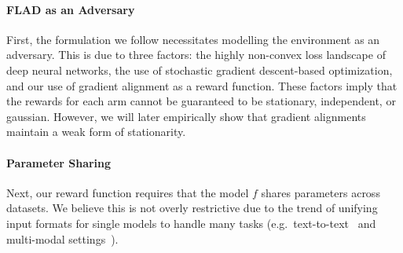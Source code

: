 \paragraph{FLAD as an Adversary} First, the formulation we follow necessitates modelling the environment as an adversary. This is due to three factors: the highly non-convex loss landscape of deep neural networks, the use of stochastic gradient descent-based optimization, and our use of gradient alignment as a reward function. These factors imply that the rewards for each arm cannot be guaranteed to be stationary, independent, or gaussian. However, we will later empirically show that gradient alignments maintain a weak form of stationarity.

\paragraph{Parameter Sharing}Next, our reward function requires that the model $\mathit{f}$ shares parameters across datasets. We believe this is not overly restrictive due to the trend of unifying input formats for single models to handle many tasks (e.g.\ text-to-text~\citep{McCann2018decaNLP,radford2019language,raffel2020t5, NEURIPS2020_1457c0d6} and multi-modal settings~\citep{wang2022ofa, alayrac2022flamingo}).

